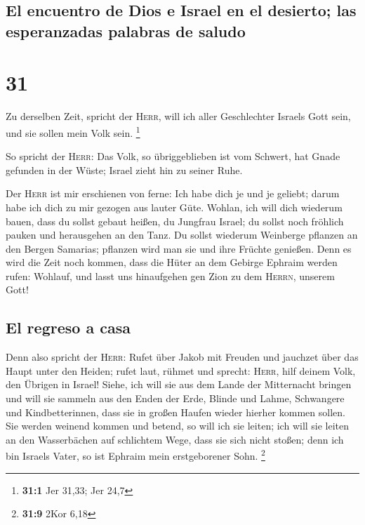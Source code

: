 \hypertarget{el-encuentro-de-dios-e-israel-en-el-desierto-las-esperanzadas-palabras-de-saludo}{%
\subsection{El encuentro de Dios e Israel en el desierto; las
esperanzadas palabras de
saludo}\label{el-encuentro-de-dios-e-israel-en-el-desierto-las-esperanzadas-palabras-de-saludo}}

\hypertarget{section-30}{%
\section{31}\label{section-30}}

 Zu derselben Zeit, spricht der \textsc{Herr}, will ich
aller Geschlechter Israels Gott sein, und sie sollen mein Volk sein.
\footnote{\textbf{31:1} Jer 31,33; Jer 24,7}

 So spricht der \textsc{Herr}: Das Volk, so übriggeblieben
ist vom Schwert, hat Gnade gefunden in der Wüste; Israel zieht hin zu
seiner Ruhe.

 Der \textsc{Herr} ist mir erschienen von ferne: Ich habe
dich je und je geliebt; darum habe ich dich zu mir gezogen aus lauter
Güte.  Wohlan, ich will dich wiederum bauen, dass du
sollst gebaut heißen, du Jungfrau Israel; du sollst noch fröhlich pauken
und herausgehen an den Tanz.  Du sollst wiederum Weinberge
pflanzen an den Bergen Samarias; pflanzen wird man sie und ihre Früchte
genießen.  Denn es wird die Zeit noch kommen, dass die
Hüter an dem Gebirge Ephraim werden rufen: Wohlauf, und lasst uns
hinaufgehen gen Zion zu dem \textsc{Herrn}, unserem Gott!

\hypertarget{el-regreso-a-casa}{%
\subsection{El regreso a casa}\label{el-regreso-a-casa}}

 Denn also spricht der \textsc{Herr}: Rufet über Jakob mit
Freuden und jauchzet über das Haupt unter den Heiden; rufet laut, rühmet
und sprecht: \textsc{Herr}, hilf deinem Volk, den Übrigen in Israel!
 Siehe, ich will sie aus dem Lande der Mitternacht bringen
und will sie sammeln aus den Enden der Erde, Blinde und Lahme,
Schwangere und Kindbetterinnen, dass sie in großen Haufen wieder hierher
kommen sollen.  Sie werden weinend kommen und betend, so
will ich sie leiten; ich will sie leiten an den Wasserbächen auf
schlichtem Wege, dass sie sich nicht stoßen; denn ich bin Israels Vater,
so ist Ephraim mein erstgeborener Sohn. \footnote{\textbf{31:9} 2Kor
  6,18}

